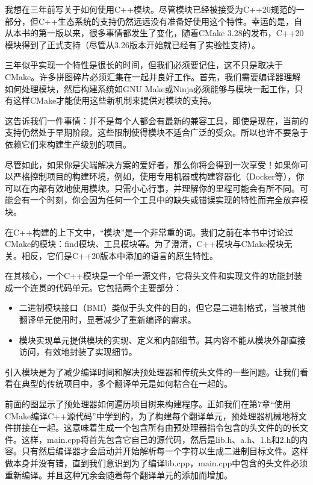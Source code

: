 我想在三年前写关于如何使用C++模块。尽管模块已经被接受为C++20规范的一部分，但C++生态系统的支持仍然远远没有准备好使用这个特性。幸运的是，自从本书的第一版以来，很多事情都发生了变化，随着CMake 3.28的发布，C++20模块得到了正式支持（尽管从3.26版本开始就已经有了实验性支持）。

三年似乎实现一个特性是很长的时间，但我们必须要记住，这不只是取决于CMake。许多拼图碎片必须汇集在一起并良好工作。首先，我们需要编译器理解如何处理模块，然后构建系统如GNU Make或Ninja必须能够与模块一起工作，只有这样CMake才能使用这些新机制来提供对模块的支持。

这告诉我们一件事情：并不是每个人都会有最新的兼容工具，即使是现在，当前的支持仍然处于早期阶段。这些限制使得模块不适合广泛的受众。所以也许不要急于依赖它们来构建生产级别的项目。

尽管如此，如果你是尖端解决方案的爱好者，那么你将会得到一次享受！如果你可以严格控制项目的构建环境，例如，使用专用机器或构建容器化（Docker等），你可以在内部有效地使用模块。只需小心行事，并理解你的里程可能会有所不同。可能会有一个时刻，你会因为任何一个工具中的缺失或错误实现的特性而完全放弃模块。

在C++构建的上下文中，“模块”是一个非常重的词。我们之前在本书中讨论过CMake的模块：find模块、工具模块等。为了澄清，C++模块与CMake模块无关。相反，它们是C++20版本中添加的语言的原生特性。

在其核心，一个C++模块是一个单一源文件，它将头文件和实现文件的功能封装成一个连贯的代码单元。它包括两个主要部分：

\begin{itemize}
\item
二进制模块接口（BMI）类似于头文件的目的，但它是二进制格式，当被其他翻译单元使用时，显著减少了重新编译的需求。

\item
模块实现单元提供模块的实现、定义和内部细节。其内容不能从模块外部直接访问，有效地封装了实现细节。
\end{itemize}

引入模块是为了减少编译时间和解决预处理器和传统头文件的一些问题。让我们看看在典型的传统项目中，多个翻译单元是如何粘合在一起的。


前面的图显示了预处理器如何遍历项目树来构建程序。正如我们在第7章“使用CMake编译C++源代码”中学到的，为了构建每个翻译单元，预处理器机械地将文件拼接在一起。这意味着生成一个包含所有由预处理器指令包含的头文件的的长文件。这样，main.cpp将首先包含它自己的源代码，然后是lib.h、a.h、1.h和2.h的内容。只有然后编译器才会启动并开始解析每一个字符以生成二进制目标文件。这样做本身并没有错，直到我们意识到为了编译lib.cpp，main.cpp中包含的头文件必须重新编译。并且这种冗余会随着每个翻译单元的添加而增加。

